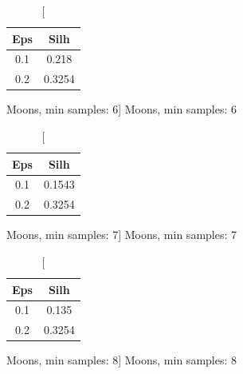 \documentclass{classrep}
\begin{document}
{{{                \begin{table}[!htbp]
                    \begin{minipage}{.24\textwidth}
                        \centering
                        \begin{tabular}{|c|c|}
                            \hline
                            Eps & Silh \\ \hline
                            0.1 & 0.218 \\ \hline
                            0.2 & 0.3254 \\ \hline
                        \end{tabular}
                        \caption
                        [Moons, min samples: 6]
                        {Moons, min samples: 6}
                        \label{db_scan_table_Moons_manh_min_sample6}
                    \end{minipage}
                    \hfill
                    \begin{minipage}{.24\textwidth}
                        \centering
                        \begin{tabular}{|c|c|}
                            \hline
                            Eps & Silh \\ \hline
                            0.1 & 0.1543 \\ \hline
                            0.2 & 0.3254 \\ \hline
                        \end{tabular}
                        \caption
                        [Moons, min samples: 7]
                        {Moons, min samples: 7}
                        \label{db_scan_table_Moons_manh_min_sample7}
                    \end{minipage}
                    \hfill
                    \begin{minipage}{.24\textwidth}
                        \centering
                        \begin{tabular}{|c|c|}
                            \hline
                            Eps & Silh \\ \hline
                            0.1 & 0.135 \\ \hline
                            0.2 & 0.3254 \\ \hline
                        \end{tabular}
                        \caption
                        [Moons, min samples: 8]
                        {Moons, min samples: 8}
                        \label{db_scan_table_Moons_manh_min_sample8}

\end{minipage}
\end{table}}}}
\end{document}
